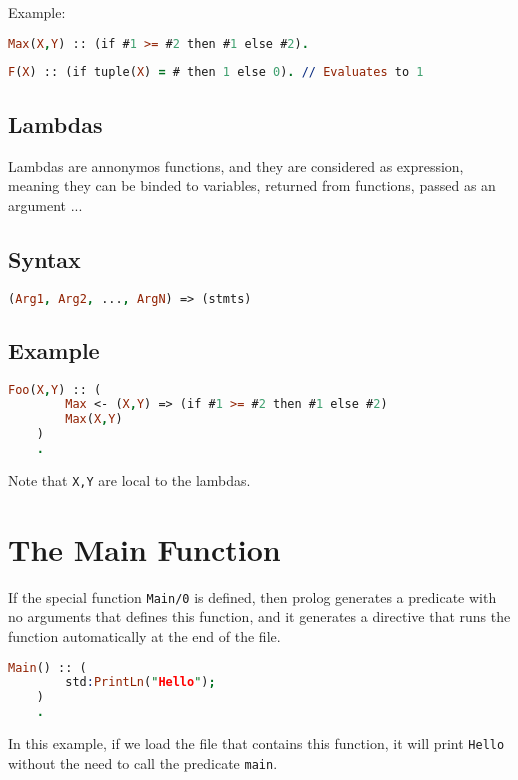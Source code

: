 Example:

\begin{lstlisting}[language = Prolog]
    Max(X,Y) :: (if #1 >= #2 then #1 else #2).
\end{lstlisting}

\begin{lstlisting}[language = Prolog]
    F(X) :: (if tuple(X) = # then 1 else 0). // Evaluates to 1
\end{lstlisting}



\subsection{Lambdas}

Lambdas are annonymos functions, and they are considered as 
expression, meaning they can be binded to variables, returned 
from functions, passed as an argument ...

\subsection{Syntax}
\begin{lstlisting}[language = Prolog]
    (Arg1, Arg2, ..., ArgN) => (stmts)
\end{lstlisting}

\subsection{Example}

\begin{lstlisting}[language = Prolog]
    Foo(X,Y) :: (
        Max <- (X,Y) => (if #1 >= #2 then #1 else #2)
        Max(X,Y)
    )
    .
\end{lstlisting}

Note that \texttt{X,Y} are local to the lambdas.

\section{The Main Function}

If the special function \texttt{Main/0} is defined, then prolog generates
a predicate with no arguments that defines this function, and it generates 
a directive that runs the function automatically at the end of the file. 


\begin{lstlisting}[language = Prolog]
    Main() :: (
        std:PrintLn("Hello");
    )
    .
\end{lstlisting}

In this example, if we load the file that contains this function, it will print \texttt{Hello} without
the need to call the predicate \texttt{main}.
